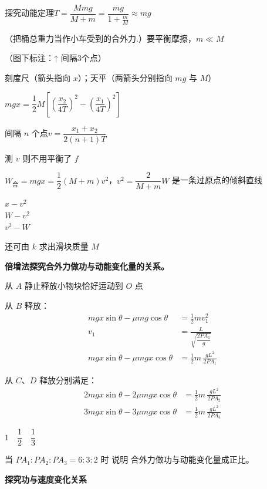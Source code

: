 探究动能定理\quad $T=\dfrac{Mmg}{M+m}=\dfrac{mg}{1+\frac{m}{M}}\approx mg$

（把桶总重力当作小车受到的合外力.）\quad 要平衡摩擦，$m\ll M$


（图下标注：↑ 间隔3个点）

刻度尺（箭头指向 $x$）；天平（两箭头分别指向 $mg$ 与 $M$）

$mgx=\dfrac12M\left[\left(\dfrac{x_2}{4T}\right)^2-\left(\dfrac{x_1}{4T}\right)^2\right]$

间隔 $n$ 个点\quad $v=\dfrac{x_1+x_2}{2(n+1)T}$


测 $v$ 则不用平衡了 $f$

$W_{\text{合}}=mgx=\dfrac12(M+m)v^2$，\quad $v^2=\dfrac{2}{M+m}W$ 是一条过原点的倾斜直线

$x-v^2$ \\
$W-v^2$ \\
$v^2-W$

还可由 $k$ 求出滑块质量 $M$

\textbf{倍增法探究合外力做功与动能变化量的关系。}


从 $A$ 静止释放小物块恰好运动到 $O$ 点

从 $B$ 释放：
\begin{align*}
mgx\sin\theta-\mu mg\cos\theta&=\frac12mv_1^2\\
v_1&=\frac{L}{\sqrt{\dfrac{2PA_1}{g}}}\\
mgx\sin\theta-\mu mgx\cos\theta&=\frac12m\,\frac{gL^2}{2PA_1}
\end{align*}

从 $C$、$D$ 释放分别满足：
\begin{align*}
2mgx\sin\theta-2\mu mgx\cos\theta&=\frac12m\,\frac{gL^2}{2PA_2}\\
3mgx\sin\theta-3\mu mgx\cos\theta&=\frac12m\,\frac{gL^2}{2PA_3}
\end{align*}

$1\quad\dfrac12\quad\dfrac13$

当 $PA_1:PA_2:PA_3=6:3:2$ 时 说明 合外力做功与动能变化量成正比。

\textbf{探究功与速度变化关系}

